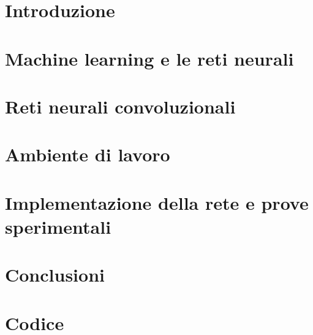 \documentclass[15pt,a4paper]{report}
\begin{document}
 
\chapter{Introduzione}




\chapter{Machine learning e le reti neurali}



\chapter{Reti neurali convoluzionali}



\normalfont
\chapter{Ambiente di lavoro}




\chapter{Implementazione della rete e prove sperimentali}




\chapter{Conclusioni}



\chapter{Codice}

%





\cleardoublepage{} %
\end{document}
